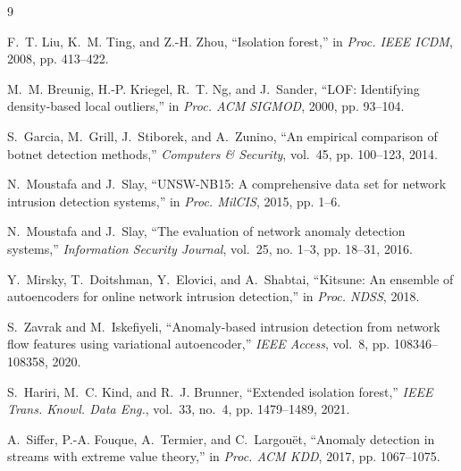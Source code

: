 \documentclass[journal]{IEEEtran}
\begin{document}

\begin{thebibliography}{9}

F.~T. Liu, K.~M. Ting, and Z.-H. Zhou, ``Isolation forest,'' in \emph{Proc.
IEEE ICDM}, 2008, pp. 413--422.

M.~M. Breunig, H.-P. Kriegel, R.~T. Ng, and J.~Sander, ``{LOF}: Identifying
density-based local outliers,'' in \emph{Proc. ACM SIGMOD}, 2000, pp. 93--104.

S.~Garcia, M.~Grill, J.~Stiborek, and A.~Zunino, ``An empirical comparison of
botnet detection methods,'' \emph{Computers \& Security}, vol.~45, pp.
100--123, 2014.

N.~Moustafa and J.~Slay, ``{UNSW-NB15}: A comprehensive data set for network
intrusion detection systems,'' in \emph{Proc. MilCIS}, 2015, pp. 1--6.

N.~Moustafa and J.~Slay, ``The evaluation of network anomaly detection
systems,'' \emph{Information Security Journal}, vol.~25, no. 1--3, pp. 18--31,
2016.

Y.~Mirsky, T.~Doitshman, Y.~Elovici, and A.~Shabtai, ``Kitsune: An ensemble of
autoencoders for online network intrusion detection,'' in \emph{Proc. NDSS},
2018.

S.~Zavrak and M.~Iskefiyeli, ``Anomaly-based intrusion detection from network
flow features using variational autoencoder,'' \emph{IEEE Access}, vol.~8, pp.
108346--108358, 2020.

S.~Hariri, M.~C. Kind, and R.~J. Brunner, ``Extended isolation forest,''
\emph{IEEE Trans. Knowl. Data Eng.}, vol.~33, no.~4, pp. 1479--1489, 2021.

A.~Siffer, P.-A. Fouque, A.~Termier, and C.~Largou\"et, ``Anomaly detection in
streams with extreme value theory,'' in \emph{Proc. ACM KDD}, 2017, pp.
1067--1075.

\end{thebibliography}
\end{document}
